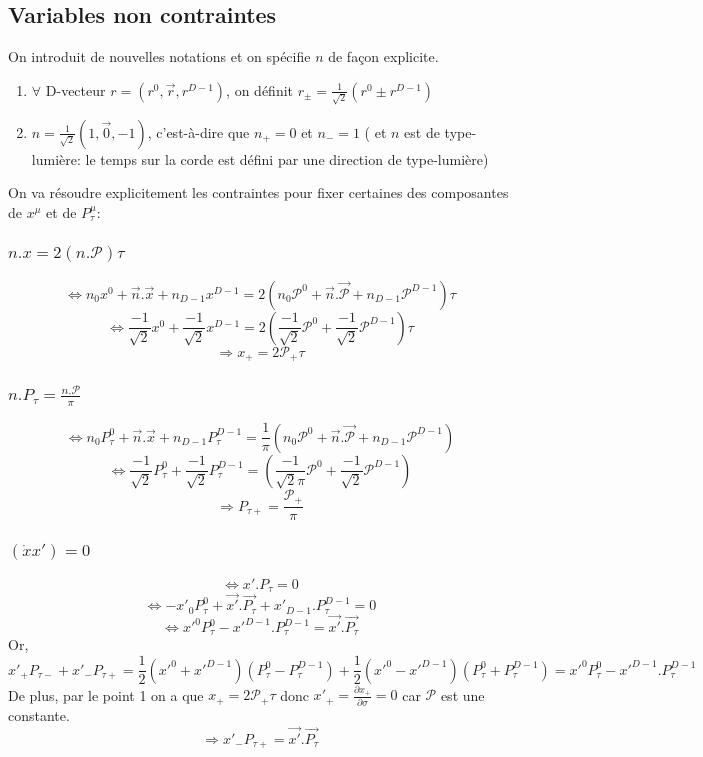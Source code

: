 \documentclass[a4paper,12pt]{article}
\def\xmu{x^\mu}
\begin{document}
\subsection{Variables non contraintes}
On introduit de nouvelles notations et on spécifie $n$ de façon explicite.
\begin{enumerate}
\item $\forall$ D-vecteur $r=(r^0,\vec{r},r^{D-1})$, on définit
$r_\pm=\frac{1}{\sqrt2}(r^0\pm r^{D-1})$
\item $n=\frac{1}{\sqrt2}(1,\vec{0},-1)$, c'est-à-dire que 
$n_+=0$ et $n_-=1$ ( et $n$ est de type-lumière: le temps sur la corde est défini par une direction de type-lumière)
\end{enumerate}
On va résoudre explicitement les contraintes pour fixer certaines des composantes de $\xmu$ et de $P_\tau^\mu$: 
\subsubsection{$n.x=2(n.\mathcal{P})\tau$}
$$\Leftrightarrow n_0x^0 + \vec{n}.\vec{x} + n_{D-1}x^{D-1}=2\left( n_0\mathcal{P}^0 + \vec{n}.\vec{\mathcal{P}} + n_{D-1}\mathcal{P}^{D-1}\right) \tau$$
$$\Leftrightarrow \frac{-1}{\sqrt{2}}x^0 + \frac{-1}{\sqrt{2}}x^{D-1}=2\left( \frac{-1}{\sqrt{2}}\mathcal{P}^0  + \frac{-1}{\sqrt{2}}\mathcal{P}^{D-1}\right) \tau$$
$$\Rightarrow\boxed{x_+ = 2 \mathcal{P_+}\tau}$$
\subsubsection{$n.P_\tau=\frac{n.\mathcal{P}}{\pi}$}
$$\Leftrightarrow n_0P_\tau^0 + \vec{n}.\vec{x} + n_{D-1}P_\tau^{D-1}=\frac{1}{\pi}\left( n_0\mathcal{P}^0 + \vec{n}.\vec{\mathcal{P}} + n_{D-1}\mathcal{P}^{D-1}\right)$$
$$\Leftrightarrow \frac{-1}{\sqrt{2}}P_\tau^0 + \frac{-1}{\sqrt{2}}P_\tau^{D-1}=\left( \frac{-1}{\sqrt{2}\pi}\mathcal{P}^0  + \frac{-1}{\sqrt{2}}\mathcal{P}^{D-1}\right) $$
$$\Rightarrow\boxed{P_{\tau+} = \frac{\mathcal{P_+}}{\pi}}$$
\subsubsection{$(\dot{x}x')=0$}
$$\Leftrightarrow x'.P_\tau=0$$
$$\Leftrightarrow -x'_0P_\tau^0 +\vec{x'}.\vec{P_\tau} + x'_{D-1}.P_\tau^{D-1} =0$$
$$\Leftrightarrow x'^0P_\tau^0 - x'^{D-1}.P_\tau^{D-1}=\vec{x'}.\vec{P_\tau}$$
Or, $$x'_+P_{\tau -} + x'_-P_{\tau +}=\frac{1}{2}\left( x'^0 + x'^{D-1}\right) \left(P_\tau^0 - P_\tau^{D-1}\right) + \frac{1}{2}\left( x'^0 - x'^{D-1}\right) \left(P_\tau^0 + P_\tau^{D-1}\right)=x'^0P_\tau^0 - x'^{D-1}.P_\tau^{D-1}$$
De plus, par le point 1 on a que $x_+ = 2 \mathcal{P_+}\tau$ donc $x'_+=\frac{\partial x_+}{\partial \sigma}=0$ car $\mathcal{P}$ est une constante.
$$\Rightarrow\boxed{x'_-P_{\tau +}=\vec{x'}.\vec{P_\tau}}$$
\end{document}
